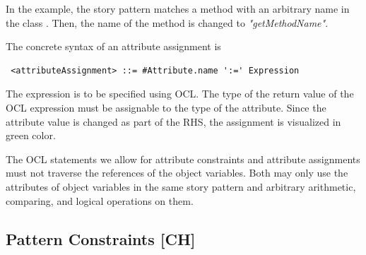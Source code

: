 
In the example, the story pattern matches a method with an arbitrary name in the class . 
Then, the name of the method is changed to \emph{"getMethodName"}. 

The concrete syntax of an attribute assignment is
\begin{lstlisting}
 <attributeAssignment> ::= #Attribute.name ':=' Expression
\end{lstlisting}
The expression is to be specified using OCL. 
The type of the return value of the OCL expression must be assignable to the type of the attribute. 
Since the attribute value is changed as part of the RHS, the assignment is visualized in green color.

The OCL statements we allow for attribute constraints and attribute assignments must not traverse the references of the object variables.
Both may only use the attributes of object variables in the same story pattern and arbitrary arithmetic, comparing, and logical operations on them. 


{
\subsection{Pattern Constraints [CH]}


} %


